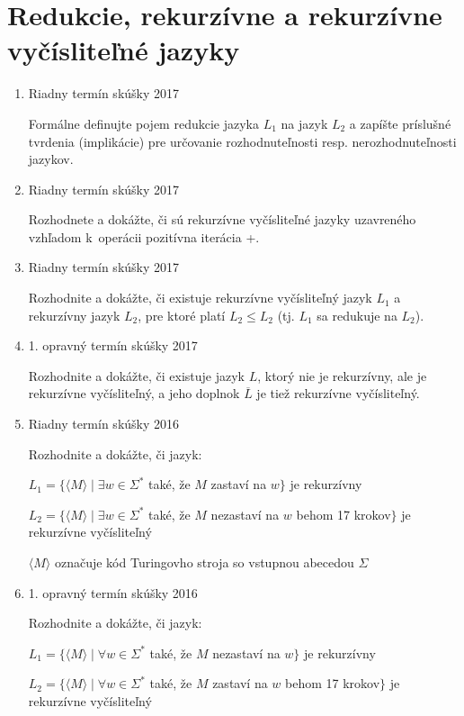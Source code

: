 \documentclass[11pt,a4paper]{article}
\begin{document}
	\section{Redukcie, rekurzívne a rekurzívne vyčísliteľné jazyky}
	\begin{enumerate}
		\item Riadny termín skúšky 2017

		Formálne definujte pojem redukcie jazyka $L_1$ na jazyk $L_2$ a zapíšte príslušné tvrdenia (implikácie) pre určovanie rozhodnuteľnosti resp. nerozhodnuteľnosti jazykov.

		\item Riadny termín skúšky 2017

		Rozhodnete a dokážte, či sú rekurzívne vyčísliteľné jazyky uzavreného vzhľadom k~operácii pozitívna iterácia +.

		\item Riadny termín skúšky 2017

		Rozhodnite a dokážte, či existuje rekurzívne vyčísliteľný jazyk $L_1$ a rekurzívny jazyk $L_2$, pre ktoré platí $L_2 \leq L_2$ (tj. $L_1$ sa redukuje na $L_2$).

		\item 1. opravný termín skúšky 2017

		Rozhodnite a dokážte, či existuje jazyk $L$, ktorý nie je rekurzívny, ale je rekurzívne vyčísliteľný, a jeho doplnok $\overline{L}$ je tiež rekurzívne vyčísliteľný.

		\item Riadny termín skúšky 2016

		Rozhodnite a dokážte, či jazyk:

		$L_1 = \{\langle M \rangle \mid \exists w \in \Sigma^*$ také, že $M$ zastaví na $w\}$ je rekurzívny

		$L_2 = \{\langle M \rangle \mid \exists w \in \Sigma^*$ také, že $M$ nezastaví na $w$ behom 17 krokov$\}$ je rekurzívne vyčísliteľný

		$\langle M \rangle$ označuje kód Turingovho stroja so vstupnou abecedou $\Sigma$

		\item 1. opravný termín skúšky 2016

		Rozhodnite a dokážte, či jazyk:

		$L_1 = \{\langle M \rangle \mid \forall w \in \Sigma^*$ také, že $M$ nezastaví na $w\}$ je rekurzívny

		$L_2 = \{\langle M \rangle \mid \forall w \in \Sigma^*$ také, že $M$ zastaví na $w$ behom 17 krokov$\}$ je rekurzívne vyčísliteľný


\end{enumerate}
\end{document}
